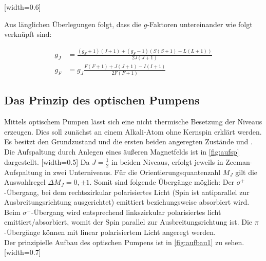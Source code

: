 [width=0.6\textwidth]

Aus länglichen Überlegungen folgt, dass die $g$-Faktoren untereinander wie folgt verknüpft sind:

\begin{align}
  g_J &= \frac{(g_S+1)(J+1) + (g_S-1)(S(S+1)-L(L+1))}{2J(J+1)} \\
  \label{eqn:näherung}
  g_F &= g_J \frac{F(F+1)+J(J+1)-I(I+1)}{2F(F+1)}
\end{align}
\subsection{Das Prinzip des optischen Pumpens}
Mittels optischem Pumpen lässt sich eine nicht thermische Besetzung der Niveaus erzeugen. Dies soll zunächst an einem Alkali-Atom ohne Kernspin erklärt werden. Es besitzt den Grundzustand  und die ersten beiden angeregten Zustände  und . Die Aufspaltung durch Anlegen eines äußeren Magnetfelds ist in \autoref{fig:aufsp} dargestellt.
[width=0.5\textwidth]
Da $J=\frac{1}{2}$ in beiden Niveaus, erfolgt jeweils in Zeeman-Aufspaltung in zwei Unterniveaus. Für die Orientierungsquantenzahl $M_J$ gilt die Auswahlregel $\Delta M_J = 0,\pm1$. Somit sind folgende Übergänge möglich: Der $\sigma^+$-Übergang, bei dem rechtszirkular polarisiertes Licht (Spin ist antiparallel zur Ausbreitungsrichtung ausgerichtet) emittiert beziehungsweise absorbiert wird. Beim $\sigma^-$-Übergang wird entsprechend linkszirkular polarisiertes licht emittiert/absorbiert, womit der Spin parallel zur Ausbreitungsrichtung ist. Die $\pi$-Übergänge können mit linear polarisiertem Licht angeregt werden.\\
Der prinzipielle Aufbau des optischen Pumpens ist in \autoref{fig:aufbau1} zu sehen.
[width=0.7\textwidth]
